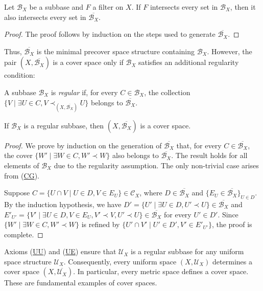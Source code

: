 \documentclass[reqno]{amsart}
\newcommand{\axref}[1]{(\hyperref[ax:#1]{#1})}
\theoremstyle{definition}
\theoremstyle{remark}
\numberwithin{figure}{section}
\newcommand{\rb}{\prec}
\begin{document}
\begin{lem}
Let $\mathcal{B}_X$ be a subbase and $F$ a filter on $X$.
If $F$ intersects every set in $\mathcal{B}_X$, then it also intersects every set in $\overline{\mathcal{B}_X}$.
\end{lem}
\begin{proof}
The proof follows by induction on the steps used to generate $\overline{\mathcal{B}_X}$.
\end{proof}

Thus, $\overline{\mathcal{B}_X}$ is the minimal precover space structure containing $\mathcal{B}_X$.
However, the pair $(X, \overline{\mathcal{B}_X})$ is a cover space only if $\mathcal{B}_X$ satisfies an additional regularity condition:

\begin{defn}
A subbase $\mathcal{B}_X$ is \emph{regular} if, for every $C \in \mathcal{B}_X$, the collection $\{ V \mid \exists U \in C, V \rb_{(X, \overline{\mathcal{B}_X})} U \}$ belongs to $\overline{\mathcal{B}_X}$.
\end{defn}

\begin{prop}
If $\mathcal{B}_X$ is a regular subbase, then $(X, \overline{\mathcal{B}_X})$ is a cover space.
\end{prop}
\begin{proof}
We prove by induction on the generation of $\overline{\mathcal{B}_X}$ that, for every $C \in \overline{\mathcal{B}_X}$, the cover $\{ W' \mid \exists W \in C, W' \rb W \}$ also belongs to $\overline{\mathcal{B}_X}$.
The result holds for all elements of $\mathcal{B}_X$ due to the regularity assumption.
The only non-trivial case arises from \axref{CG}.

Suppose $C = \{ U \cap V \mid U \in D, V \in E_U \} \in \mathcal{C}_X$, where $D \in \overline{\mathcal{B}_X}$ and $\{ E_U \in \overline{\mathcal{B}_X} \}_{U \in D}$.
By the induction hypothesis, we have $D' = \{ U' \mid \exists U \in D, U' \rb U \} \in \overline{\mathcal{B}_X}$ and $E'_{U'} = \{ V' \mid \exists U \in D, V \in E_U, V' \rb V, U' \rb U \} \in \overline{\mathcal{B}_X}$ for every $U' \in D'$.
Since $\{ W' \mid \exists W \in C, W' \rb W \}$ is refined by $\{ U' \cap V' \mid U' \in D', V' \in E'_{U'} \}$, the proof is complete.
\end{proof}

Axioms \axref{UU} and \axref{UE} ensure that $\mathcal{U}_X$ is a regular subbase for any uniform space structure $\mathcal{U}_X$.
Consequently, every uniform space $(X, \mathcal{U}_X)$ determines a cover space $(X, \overline{\mathcal{U}_X})$.
In particular, every metric space defines a cover space.
These are fundamental examples of cover spaces.
\end{document}
